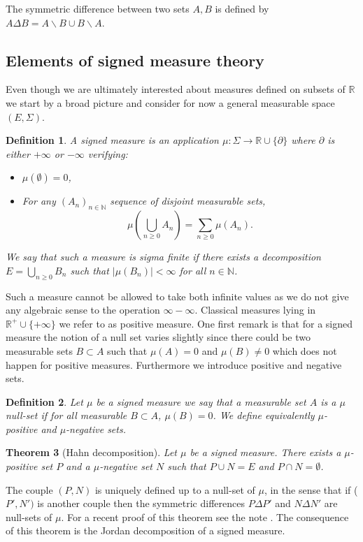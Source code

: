 \documentclass[11pt,a4paper]{article}
\newcommand{\RR}{\mathbb{R}}
\newcommand{\NN}{\mathbb{N}}
\newcommand{\Seq}[1]{\left(#1\right)_{n\in \mathbb{N}}}
\newtheorem{theorem}{Theorem}[section]
\newtheorem{definition}[theorem]{Definition}
\begin{document}
The symmetric difference between two sets $A,B$ is defined by $A\Delta B = A\backslash B \cup B\backslash A$.
\subsection{Elements of signed measure theory}
Even though we are ultimately interested about measures defined on subsets of $\RR$ we start by a broad picture and consider for now a general measurable space $(E,\Sigma)$.
\begin{definition}
    A signed measure is an application $\mu : \Sigma \to \RR \cup\lbrace \partial \rbrace$ where $\partial $ is either $+\infty$ or $-\infty$ verifying:
    \begin{itemize}
        \item $\mu(\emptyset) = 0$,
        \item For any $\Seq{A_n}$ sequence of disjoint measurable sets,
        \[\mu \left( \bigcup\limits_{n \geq 0} A_n\right) = \sum\limits_{n \geq 0} \mu(A_n).\]
    \end{itemize}
    We say that such a measure is sigma finite if there exists a decomposition $E = \bigcup\limits_{n \geq 0} B_n$ such that $|\mu(B_n)| < \infty$ for all $n \in \NN$.
\end{definition}
Such a measure cannot be allowed to take both infinite values as we do not give any algebraic sense to the operation $\infty - \infty$. Classical measures lying in $\RR^+\cup\lbrace +\infty\rbrace$ we refer to as positive measure. One first remark is that for a signed measure the notion of a null set varies slightly since there could be two measurable sets $B\subset A$ such that $\mu(A) = 0$ and $\mu(B) \neq 0$ which does not happen for positive measures. Furthermore we introduce positive and negative sets.
\begin{definition}
    Let $\mu$ be a signed measure we say that a measurable set $A$ is a $\mu$ null-set if for all measurable $B \subset A$, $\mu(B) = 0$. We define equivalently $\mu$-positive and $\mu$-negative sets.
\end{definition}
\begin{theorem}[Hahn decomposition]
    Let $\mu$ be a signed measure. There exists a $\mu$-positive set $P$ and a $\mu$-negative set $N$ such that $P\cup N = E$ and $P\cap N = \emptyset$. 
\end{theorem}
The couple $(P,N)$ is uniquely defined up to a null-set of $\mu$, in the sense that if ($P',N')$ is another couple then the symmetric differences $P\Delta P'$ and $N\Delta N'$ are null-sets of $\mu$. For a recent proof of this theorem see the note \cite{fischer2012existence}. The consequence of this theorem is the Jordan decomposition of a signed measure.
\end{document}
